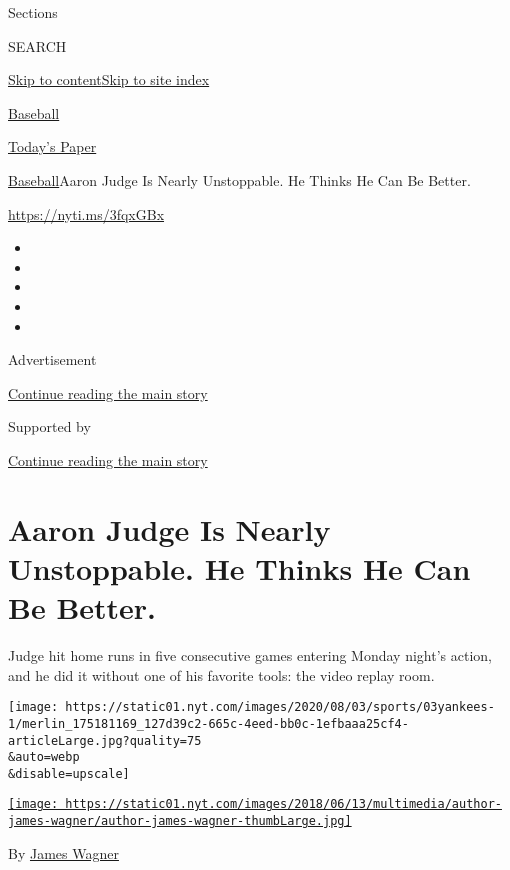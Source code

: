Sections

SEARCH

\protect\hyperlink{site-content}{Skip to
content}\protect\hyperlink{site-index}{Skip to site index}

\href{https://www.nytimes.com/section/sports/baseball}{Baseball}

\href{https://myaccount.nytimes.com/auth/login?response_type=cookie\&client_id=vi}{}

\href{https://www.nytimes.com/section/todayspaper}{Today's Paper}

\href{/section/sports/baseball}{Baseball}\textbar{}Aaron Judge Is Nearly
Unstoppable. He Thinks He Can Be Better.

\url{https://nyti.ms/3fqxGBx}

\begin{itemize}
\item
\item
\item
\item
\item
\end{itemize}

Advertisement

\protect\hyperlink{after-top}{Continue reading the main story}

Supported by

\protect\hyperlink{after-sponsor}{Continue reading the main story}

\hypertarget{aaron-judge-is-nearly-unstoppable-he-thinks-he-can-be-better}{%
\section{Aaron Judge Is Nearly Unstoppable. He Thinks He Can Be
Better.}\label{aaron-judge-is-nearly-unstoppable-he-thinks-he-can-be-better}}

Judge hit home runs in five consecutive games entering Monday night's
action, and he did it without one of his favorite tools: the video
replay room.

\texttt{[image: https://static01.nyt.com/images/2020/08/03/sports/03yankees-1/merlin\_175181169\_127d39c2-665c-4eed-bb0c-1efbaaa25cf4-articleLarge.jpg?quality=75\\\&auto=webp\\\&disable=upscale]}

\href{https://www.nytimes.com/by/james-wagner}{\texttt{[image: https://static01.nyt.com/images/2018/06/13/multimedia/author-james-wagner/author-james-wagner-thumbLarge.jpg]}}

By \href{https://www.nytimes.com/by/james-wagner}{James Wagner}

